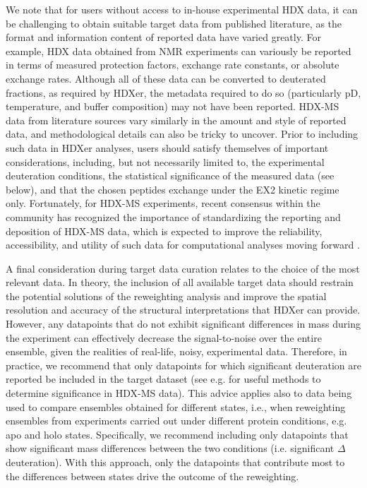 \documentclass[9pt,tutorial]{livecoms}
\begin{document}
We note that for users without access to in-house experimental HDX data, it can be challenging to obtain suitable target data from published literature, as the format and information content of reported data have varied greatly.
For example, HDX data obtained from NMR experiments can variously be reported in terms of measured protection factors, exchange rate constants, or absolute exchange rates.
Although all of these data can be converted to deuterated fractions, as required by HDXer, the metadata required to do so (particularly pD, temperature, and buffer composition) may not have been reported.
HDX-MS data from literature sources vary similarly in the amount and style of reported data, and methodological details can also be tricky to uncover.
Prior to including such data in HDXer analyses, users should satisfy themselves of important considerations, including, but not necessarily limited to, the experimental deuteration conditions, the statistical significance of the measured data (see below), and that the chosen peptides exchange under the EX2 kinetic regime only.
Fortunately, for HDX-MS experiments, recent consensus within the community has recognized the importance of standardizing the reporting and deposition of HDX-MS data, which is expected to improve the reliability, accessibility, and utility of such data for computational analyses moving forward \cite{Masson2019}.

A final consideration during target data curation relates to the choice of the most relevant data. 
In theory, the inclusion of all available target data should restrain the potential solutions of the reweighting analysis and improve the spatial resolution and accuracy of the structural interpretations that HDXer can provide.
However, any datapoints that do not exhibit significant differences in mass during the experiment can effectively decrease the signal-to-noise over the entire ensemble, given the realities of real-life, noisy, experimental data.
Therefore, in practice, we recommend that only datapoints for which significant deuteration are reported be included in the target dataset (see e.g. \cite{Hageman2019, Weis2021} for useful methods to determine significance in HDX-MS data).
This advice applies also to data being used to compare ensembles obtained for different states, i.e., when reweighting ensembles from experiments carried out under different protein conditions, e.g. apo and holo states. 
Specifically, we recommend including only datapoints that show significant mass differences between the two conditions (i.e. significant $\Delta$deuteration).
With this approach, only the datapoints that contribute most to the differences between states drive the outcome of the reweighting.
\end{document}
